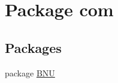 \hypertarget{namespacecom}{}\section{Package com}
\label{namespacecom}
\subsection*{Packages}
\begin{DoxyCompactItemize}
\item 
package \mbox{\hyperlink{namespacecom_1_1_b_n_u}{B\+NU}}
\end{DoxyCompactItemize}
